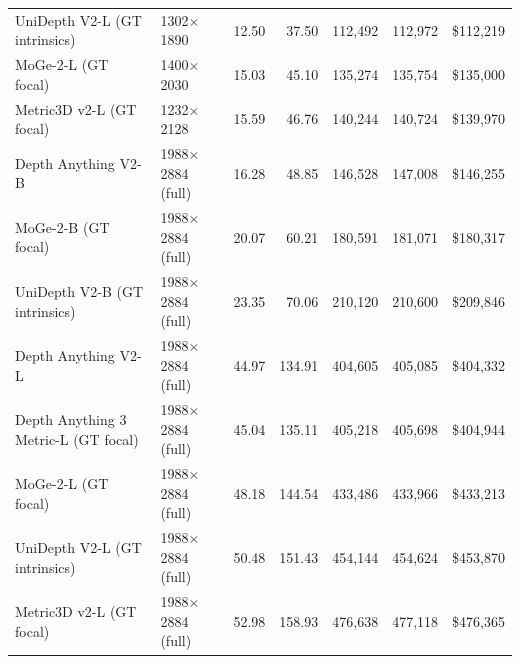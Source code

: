 \begin{tabular}{llrrrrr}
UniDepth V2-L (GT intrinsics) & 1302$\times$1890 & 12.50 & 37.50 & 112,492 & 112,972 & \$112,219 \\
MoGe-2-L (GT focal) & 1400$\times$2030 & 15.03 & 45.10 & 135,274 & 135,754 & \$135,000 \\
Metric3D v2-L (GT focal) & 1232$\times$2128 & 15.59 & 46.76 & 140,244 & 140,724 & \$139,970 \\
Depth Anything V2-B & 1988$\times$2884 (full) & 16.28 & 48.85 & 146,528 & 147,008 & \$146,255 \\
MoGe-2-B (GT focal) & 1988$\times$2884 (full) & 20.07 & 60.21 & 180,591 & 181,071 & \$180,317 \\
UniDepth V2-B (GT intrinsics) & 1988$\times$2884 (full) & 23.35 & 70.06 & 210,120 & 210,600 & \$209,846 \\
Depth Anything V2-L & 1988$\times$2884 (full) & 44.97 & 134.91 & 404,605 & 405,085 & \$404,332 \\
Depth Anything 3 Metric-L (GT focal) & 1988$\times$2884 (full) & 45.04 & 135.11 & 405,218 & 405,698 & \$404,944 \\
MoGe-2-L (GT focal) & 1988$\times$2884 (full) & 48.18 & 144.54 & 433,486 & 433,966 & \$433,213 \\
UniDepth V2-L (GT intrinsics) & 1988$\times$2884 (full) & 50.48 & 151.43 & 454,144 & 454,624 & \$453,870 \\
Metric3D v2-L (GT focal) & 1988$\times$2884 (full) & 52.98 & 158.93 & 476,638 & 477,118 & \$476,365 \\
\bottomrule
\end{tabular}
